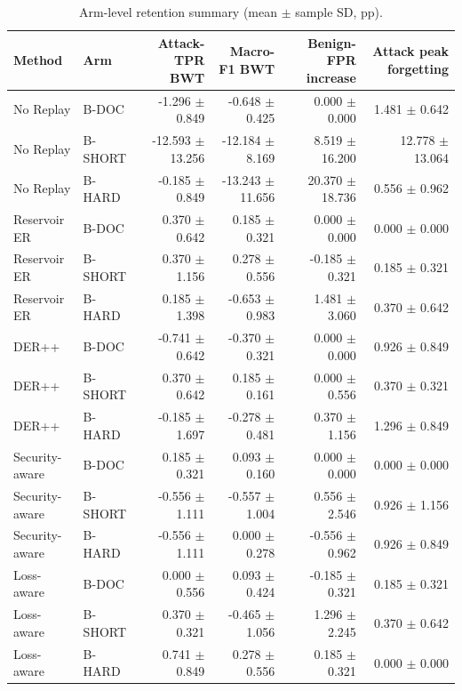 \documentclass[conference]{IEEEtran}
\begin{document}
\begin{table}[t]
\caption{Arm-level retention summary (mean $\pm$ sample SD, pp).}
\label{tab:arm-retention}

\centering
\scriptsize
\setlength{\tabcolsep}{3.8pt}
\begin{tabular}{@{}llrrrr@{}}
\toprule
Method & Arm & Attack-TPR BWT & Macro-F1 BWT & Benign-FPR increase & Attack peak forgetting \\
\midrule
No Replay & B-DOC & -1.296 $\pm$ 0.849 & -0.648 $\pm$ 0.425 & 0.000 $\pm$ 0.000 & 1.481 $\pm$ 0.642 \\
No Replay & B-SHORT & -12.593 $\pm$ 13.256 & -12.184 $\pm$ 8.169 & 8.519 $\pm$ 16.200 & 12.778 $\pm$ 13.064 \\
No Replay & B-HARD & -0.185 $\pm$ 0.849 & -13.243 $\pm$ 11.656 & 20.370 $\pm$ 18.736 & 0.556 $\pm$ 0.962 \\
Reservoir ER & B-DOC & 0.370 $\pm$ 0.642 & 0.185 $\pm$ 0.321 & 0.000 $\pm$ 0.000 & 0.000 $\pm$ 0.000 \\
Reservoir ER & B-SHORT & 0.370 $\pm$ 1.156 & 0.278 $\pm$ 0.556 & -0.185 $\pm$ 0.321 & 0.185 $\pm$ 0.321 \\
Reservoir ER & B-HARD & 0.185 $\pm$ 1.398 & -0.653 $\pm$ 0.983 & 1.481 $\pm$ 3.060 & 0.370 $\pm$ 0.642 \\
DER++ & B-DOC & -0.741 $\pm$ 0.642 & -0.370 $\pm$ 0.321 & 0.000 $\pm$ 0.000 & 0.926 $\pm$ 0.849 \\
DER++ & B-SHORT & 0.370 $\pm$ 0.642 & 0.185 $\pm$ 0.161 & 0.000 $\pm$ 0.556 & 0.370 $\pm$ 0.321 \\
DER++ & B-HARD & -0.185 $\pm$ 1.697 & -0.278 $\pm$ 0.481 & 0.370 $\pm$ 1.156 & 1.296 $\pm$ 0.849 \\
Security-aware & B-DOC & 0.185 $\pm$ 0.321 & 0.093 $\pm$ 0.160 & 0.000 $\pm$ 0.000 & 0.000 $\pm$ 0.000 \\
Security-aware & B-SHORT & -0.556 $\pm$ 1.111 & -0.557 $\pm$ 1.004 & 0.556 $\pm$ 2.546 & 0.926 $\pm$ 1.156 \\
Security-aware & B-HARD & -0.556 $\pm$ 1.111 & 0.000 $\pm$ 0.278 & -0.556 $\pm$ 0.962 & 0.926 $\pm$ 0.849 \\
Loss-aware & B-DOC & 0.000 $\pm$ 0.556 & 0.093 $\pm$ 0.424 & -0.185 $\pm$ 0.321 & 0.185 $\pm$ 0.321 \\
Loss-aware & B-SHORT & 0.370 $\pm$ 0.321 & -0.465 $\pm$ 1.056 & 1.296 $\pm$ 2.245 & 0.370 $\pm$ 0.642 \\
Loss-aware & B-HARD & 0.741 $\pm$ 0.849 & 0.278 $\pm$ 0.556 & 0.185 $\pm$ 0.321 & 0.000 $\pm$ 0.000 \\
\bottomrule
\end{tabular}


\end{table}
\end{document}
